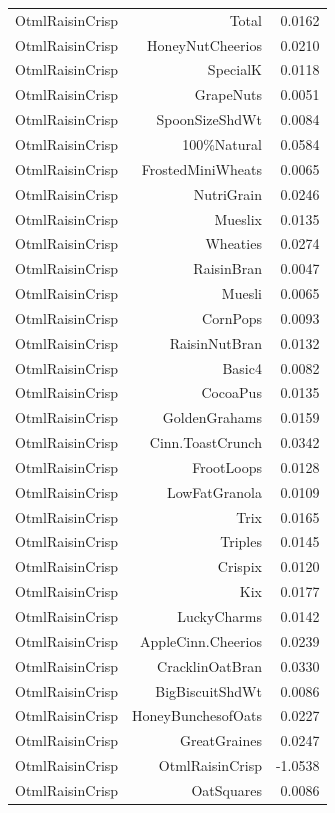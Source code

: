 \begin{longtable}{@{}lrr@{}}
OtmlRaisinCrisp & Total & 0.0162 \\
OtmlRaisinCrisp & HoneyNutCheerios & 0.0210 \\
OtmlRaisinCrisp & SpecialK & 0.0118 \\
OtmlRaisinCrisp & GrapeNuts & 0.0051 \\
OtmlRaisinCrisp & SpoonSizeShdWt & 0.0084 \\
OtmlRaisinCrisp & 100\%Natural & 0.0584 \\
OtmlRaisinCrisp & FrostedMiniWheats & 0.0065 \\
OtmlRaisinCrisp & NutriGrain & 0.0246 \\
OtmlRaisinCrisp & Mueslix & 0.0135 \\
OtmlRaisinCrisp & Wheaties & 0.0274 \\
OtmlRaisinCrisp & RaisinBran & 0.0047 \\
OtmlRaisinCrisp & Muesli & 0.0065 \\
OtmlRaisinCrisp & CornPops & 0.0093 \\
OtmlRaisinCrisp & RaisinNutBran & 0.0132 \\
OtmlRaisinCrisp & Basic4 & 0.0082 \\
OtmlRaisinCrisp & CocoaPus & 0.0135 \\
OtmlRaisinCrisp & GoldenGrahams & 0.0159 \\
OtmlRaisinCrisp & Cinn.ToastCrunch & 0.0342 \\
OtmlRaisinCrisp & FrootLoops & 0.0128 \\
OtmlRaisinCrisp & LowFatGranola & 0.0109 \\
OtmlRaisinCrisp & Trix & 0.0165 \\
OtmlRaisinCrisp & Triples & 0.0145 \\
OtmlRaisinCrisp & Crispix & 0.0120 \\
OtmlRaisinCrisp & Kix & 0.0177 \\
OtmlRaisinCrisp & LuckyCharms & 0.0142 \\
OtmlRaisinCrisp & AppleCinn.Cheerios & 0.0239 \\
OtmlRaisinCrisp & CracklinOatBran & 0.0330 \\
OtmlRaisinCrisp & BigBiscuitShdWt & 0.0086 \\
OtmlRaisinCrisp & HoneyBunchesofOats & 0.0227 \\
OtmlRaisinCrisp & GreatGraines & 0.0247 \\
OtmlRaisinCrisp & OtmlRaisinCrisp & -1.0538 \\
OtmlRaisinCrisp & OatSquares & 0.0086 \\

\end{longtable}
